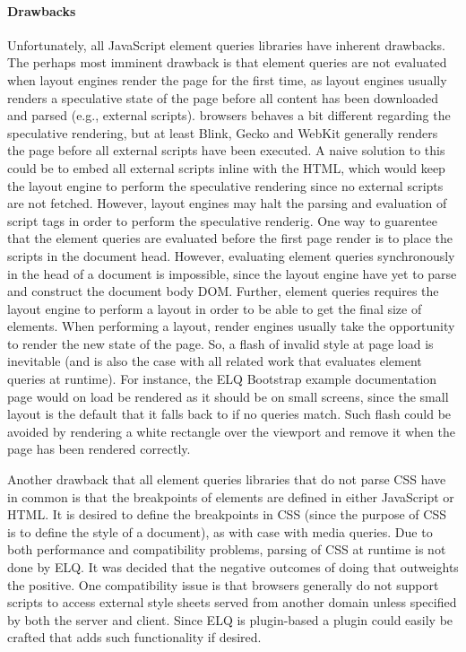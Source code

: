 \documentclass[a4paper,11pt]{kth-mag}
\begin{document}
    \paragraph{Drawbacks}
    Unfortunately, all \gls{JavaScript} element queries libraries have inherent drawbacks.
    The perhaps most imminent drawback is that element queries are not evaluated when \glspl{layout engine} render the page for the first time, as \glspl{layout engine} usually renders a speculative state of the page before all content has been downloaded and parsed (e.g., external scripts).
    \Glspl{browser} behaves a bit different regarding the speculative rendering, but at least \gls{Blink}, \gls{Gecko} and \gls{WebKit} generally renders the page before all external scripts have been executed.
    A naive solution to this could be to embed all external scripts inline with the \gls{HTML}, which would keep the \gls{layout engine} to perform the speculative rendering since no external scripts are not fetched.
    However, \glspl{layout engine} may halt the parsing and evaluation of script tags in order to perform the speculative renderig.
    One way to guarentee that the element queries are evaluated before the first page render is to place the scripts in the \gls{document} head.
    However, evaluating element queries synchronously in the head of a \gls{document} is impossible, since the \gls{layout engine} have yet to parse and construct the document body \gls{DOM}.
    Further, element queries requires the \gls{layout engine} to perform a layout in order to be able to get the final size of \glspl{element}.
    When performing a layout, render engines usually take the opportunity to render the new state of the page.
    So, a flash of invalid style at page load is inevitable (and is also the case with all related work that evaluates element queries at runtime).
    For instance, the \gls{ELQ} \gls{Bootstrap} example documentation page would on load be rendered as it should be on small screens, since the small layout is the default that it falls back to if no queries match.
    Such flash could be avoided by rendering a white rectangle over the \gls{viewport} and remove it when the page has been rendered correctly.

    Another drawback that all element queries libraries that do not parse \gls{CSS} have in common is that the breakpoints of \glspl{element} are defined in either \gls{JavaScript} or \gls{HTML}.
    It is desired to define the breakpoints in \gls{CSS} (since the purpose of \gls{CSS} is to define the style of a document), as with case with \gls{media queries}.
    Due to both performance and compatibility problems, parsing of \gls{CSS} at runtime is not done by \gls{ELQ}.
    It was decided that the negative outcomes of doing that outweights the positive.
    One compatibility issue is that \glspl{browser} generally do not support scripts to access external style sheets served from another domain unless specified by both the server and client.
    Since \gls{ELQ} is plugin-based a plugin could easily be crafted that adds such functionality if desired.
\end{document}
